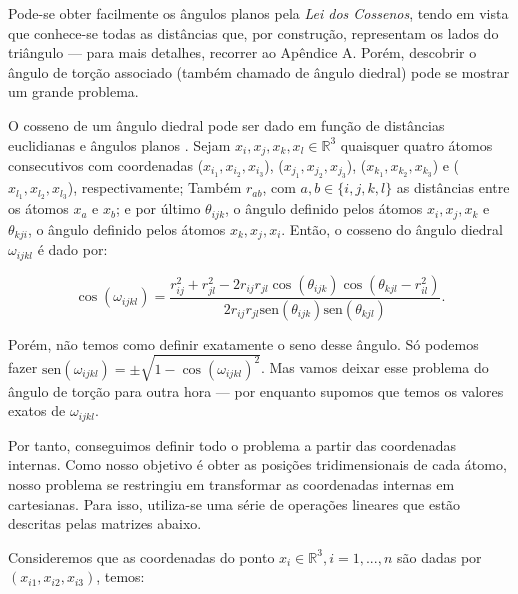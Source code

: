\documentclass[a4paper,12pt]{article}
\begin{document}
	Pode-se obter facilmente os ângulos planos pela \textit{Lei dos Cossenos}, tendo em vista que conhece-se todas as distâncias que, por construção, representam os lados do triângulo --- para mais detalhes, recorrer ao Apêndice A. Porém, descobrir o ângulo de torção associado (também chamado de ângulo diedral) pode se mostrar um grande problema. 
	
	O cosseno de um ângulo diedral pode ser dado em função de distâncias euclidianas e ângulos planos \cite{carlileTese}. Sejam $x_i, x_j, x_k, x_l \in \mathbb{R}^3$ quaisquer quatro átomos consecutivos com coordenadas ($x_{i_1}, x_{i_2}, x_{i_3}$), ($x_{j_1}, x_{j_2}, x_{j_3}$), ($x_{k_1}, x_{k_2}, x_{k_3}$) e ($x_{l_1}, x_{l_2}, x_{l_3}$), respectivamente; Também $r_{ab}$, com $a,b \in \{i,j,k,l\}$ as distâncias entre os átomos $x_a$ e $x_b$; e por último $\theta_{ijk}$, o ângulo definido pelos átomos $x_i, x_j, x_k$ e $\theta_{kji}$, o ângulo definido pelos átomos $x_k, x_j, x_i$. Então, o cosseno do ângulo diedral $\omega_{ijkl}$ é dado por:
	
	\begin{equation}
	\cos(\omega_{ijkl}) = \frac{r^2_{ij} + r^2_{jl} - 2r_{ij}r_{jl}\cos(\theta_{ijk})\cos(\theta_{kjl}-r^2_{il})}{2r_{ij}r_{jl}\mbox{sen}(\theta_{ijk})\mbox{sen}(\theta_{kjl})}. \label{eq:cosOmega}
	\end{equation}    
	
	Porém, não temos como definir exatamente o seno desse ângulo. Só podemos fazer $\mbox{sen}(\omega_{ijkl}) = \pm\sqrt{1 - \cos(\omega_{ijkl})^2} \label{eq:senOmega}$. Mas vamos deixar esse problema do ângulo de torção para outra hora --- por enquanto supomos que temos os valores exatos de $\omega_{ijkl}$.
	
	Por tanto, conseguimos definir todo o problema a partir das coordenadas internas. Como nosso objetivo é obter as posições tridimensionais de cada átomo, nosso problema se restringiu em transformar as coordenadas internas em cartesianas. Para isso, utiliza-se uma série de operações lineares que estão descritas pelas matrizes abaixo.
	
	Consideremos que as coordenadas do ponto $x_{i} \in\mathbb{R}^3,i= 1, ...,n $ são dadas por $(x_{i1},x_{i2},x_{i3})$, temos:
	
\end{document}
